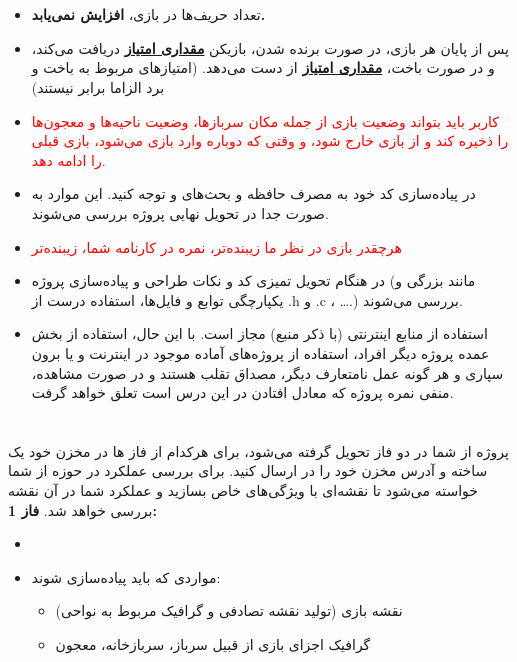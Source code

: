 \documentclass[]{article}
\begin{document}
\section*{{}}
\begin{itemize}
    \item{
    تعداد حریف‌ها در بازی،
    \textbf{افزایش نمی‌یابد.}
    } 
    \item{ 
    پس از پایان هر بازی، در صورت برنده شدن، بازیکن
    \textbf{\underline{مقداری امتیاز}}
    دریافت می‌کند، و در صورت باخت،
    \textbf{\underline{مقداری امتیاز}}
    از دست می‌دهد. (امتیازهای مربوط به باخت و برد الزاما برابر نیستند)
    }
    \item{ 
    \textcolor{red}{کاربر باید بتواند وضعیت بازی از جمله مکان سرباز‌ها، وضعیت ناحیه‌ها و معجون‌ها را ذخیره کند و از بازی خارج شود، و وقتی که دوباره وارد بازی می‌شود، بازی قبلی را ادامه دهد.}
    }
    \item{ 
    در پیاده‌سازی کد خود به مصرف حافظه و بحث‌های
    و
    توجه کنید. این موارد به صورت جدا در تحویل نهایی پروژه بررسی می‌شوند.
    }
    \item{
    \textcolor{red}{هر‌چقدر بازی در نظر ما زیبنده‌تر، نمره در کارنامه شما، زیبنده‌تر
}
    }
    \item{
    در هنگام تحویل تمیزی کد و نکات طراحی و پیاده‌سازی پروژه (مانند بزرگی و یکپارچگی توابع و فایل‌ها، استفاده درست از .h و .c ، ….) بررسی می‌شوند.
    }


    \item{
استفاده از منابع اینترنتی (با ذکر منبع) مجاز است. با این حال، استفاده از بخش عمده پروژه دیگر افراد، استفاده از پروژه‌های آماده موجود در اینترنت و یا برون سپاری و هر گونه عمل نامتعارف دیگر، مصداق تقلب هستند و در صورت مشاهده، منفی نمره پروژه که معادل افتادن در این درس است تعلق خواهد گرفت.
}
\end{itemize}

\newpage


\section*{{}}
پروژه از شما در دو فاز تحویل گرفته می‌شود، برای هرکدام از فاز ها در مخزن
خود یک
ساخته و آدرس مخزن خود را در
ارسال کنید.
\newline
برای بررسی عملکرد در حوزه
از شما خواسته می‌شود تا نقشه‌ای با ویژگی‌های خاص بسازید و عملکرد شما در آن نقشه بررسی ‌خواهد شد.
\newline
\textbf{فاز 1:}
\begin{itemize}
    \item{
    }
    \item{
    مواردی که باید پیاده‌سازی شوند:
    \begin{itemize}
        \item{نقشه بازی (تولید نقشه تصادفی و گرافیک مربوط به نواحی)
}
        \item{گرافیک اجزای بازی از قبیل سرباز، سربازخانه، معجون
}
    \end{itemize}
    }
\end{itemize}
\end{document}
